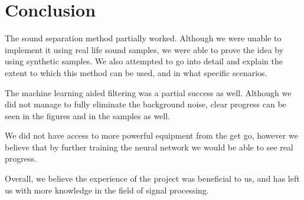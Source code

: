 \chapter{Conclusion}\label{ch:conclusion}
The sound separation method partially worked. Although we were unable to implement it using
real life sound samples, we were able to prove the idea by using synthetic samples. We also
attempted to go into detail and explain the extent to which this method can be used, and in 
what specific scenarios.

The machine learning aided filtering was a partial success as well. Although we did not
manage to fully eliminate the background noise, clear progress can be seen in the figures
and in the samples as well.

We did not have access to more powerful equipment from the get go, however we believe
that by further training the neural network we would be able to see real progress.

Overall, we believe the experience of the project was beneficial to us, and has left us
with more knowledge in the field of signal processing.